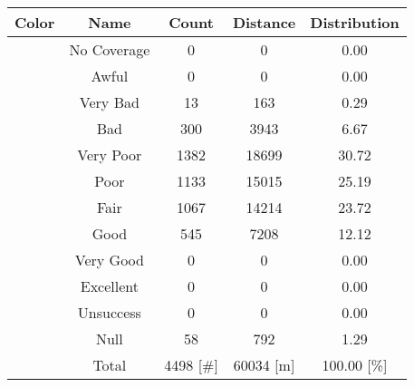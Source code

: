 \begin{tabular}{|c|c|c|c|c|}\hline
\rowcolor{Plum!20}
Color&Name&Count&Distance&Distribution\\\hline\hline
\cellcolor[HTML]{aaaaaa} &No Coverage&0&0&0.00\\\hline
\cellcolor[HTML]{820000} &Awful&0&0&0.00\\\hline
\cellcolor[HTML]{dc143c} &Very Bad&13&163&0.29\\\hline
\cellcolor[HTML]{ff0000} &Bad&300&3943&6.67\\\hline
\cellcolor[HTML]{fa6400} &Very Poor&1382&18699&30.72\\\hline
\cellcolor[HTML]{ffaa00} &Poor&1133&15015&25.19\\\hline
\cellcolor[HTML]{ffff00} &Fair&1067&14214&23.72\\\hline
\cellcolor[HTML]{00d228} &Good&545&7208&12.12\\\hline
\cellcolor[HTML]{00a032} &Very Good&0&0&0.00\\\hline
\cellcolor[HTML]{00703c} &Excellent&0&0&0.00\\\hline
\cellcolor[HTML]{1e90ff} &Unsuccess&0&0&0.00\\\hline
\cellcolor[HTML]{000000} &Null&58&792&1.29\\\hline
\cellcolor[HTML]{ffffff} &Total&4498 [\#]&60034 [m]&100.00 [\%]\\\hline
\end{tabular}
